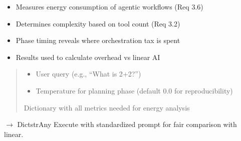\documentclass[letterpaper,10pt,english]{sphinxmanual}
\begin{document}
\begin{fulllineitems}
\begin{fulllineitems}
\begin{description}
\begin{itemize}
\item {} 
\sphinxAtStartPar
Measures energy consumption of agentic workflows (Req 3.6)

\item {} 
\sphinxAtStartPar
Determines complexity based on tool count (Req 3.2)

\item {} 
\sphinxAtStartPar
Phase timing reveals where orchestration tax is spent

\item {} 
\sphinxAtStartPar
Results used to calculate overhead vs linear AI

\end{itemize}

\end{description}
\begin{quote}\begin{description}
\begin{itemize}
\item {} 
\sphinxAtStartPar
{} \textendash{} User query (e.g., “What is 2+2?”)

\item {} 
\sphinxAtStartPar
{} \textendash{} Temperature for planning phase (default 0.0 for reproducibility)

\end{itemize}

\sphinxAtStartPar
Dictionary with all metrics needed for energy analysis

\end{description}\end{quote}

\end{fulllineitems}


\begin{fulllineitems}
\label{\detokenize{core.execution.agentic:core.execution.agentic.AgenticExecutor.execute_comparison}}
\pysigstartsignatures
\pysiglinewithargsret
{}
{}
{{ $\rightarrow$ Dict\DUrole{p}{{[}}strAny\DUrole{p}{{]}}}}
\pysigstopsignatures
\sphinxAtStartPar
Execute with standardized prompt for fair comparison with linear.


\end{fulllineitems}
\end{fulllineitems}
\end{document}
